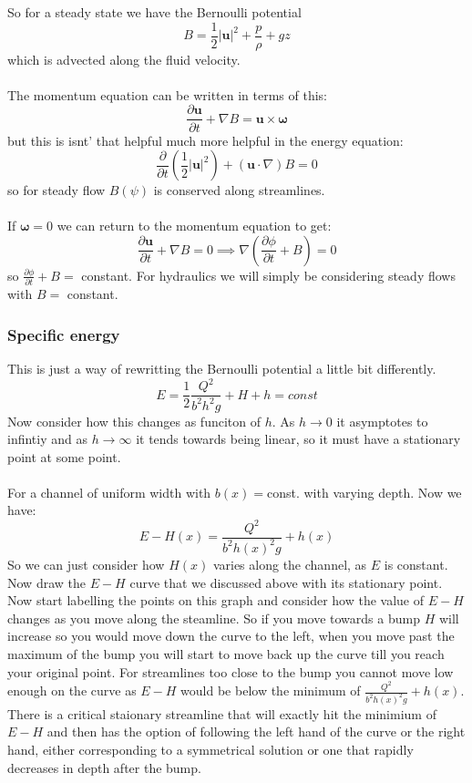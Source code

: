 \documentclass{article}
\begin{document}
So for a steady state we have the Bernoulli potential 
$$
 B = \frac{1}{2} | \bm u|^2 + \frac{p}{\rho} + g z
$$
which is advected along the fluid velocity.\\\\
The momentum equation can be written in terms of this:
$$
 \frac{\partial \bm u}{\partial t} + \nabla B = \bm u \times \bm \omega
$$
but this is isnt' that helpful much more helpful in the energy equation:
$$
 \frac{\partial}{\partial t} ( \frac{1}{2} | \bm u |^2) + (\bm u \cdot \nabla ) B = 0
$$
 so for steady flow $B(\psi)$ is conserved along streamlines.\\\\
 If $\bm \omega = 0$ we can return to the momentum equation to get:
 $$
  \frac{\partial \bm u}{\partial t} + \nabla B  =0 \implies \nabla ( \frac{\partial \phi}{\partial t} + B) = 0
 $$
 so $\frac{\partial \phi}{\partial t} + B =$ constant. For hydraulics we will simply be considering steady flows with $B =$ constant.
 \subsubsection{Specific energy}
 This is just a way of rewritting the Bernoulli potential a little bit differently. 
 $$
  E = \frac{1}{2} \frac{Q^2}{b^2 h^2 g} + H + h = const
 $$
 Now consider how this changes as funciton of $h$. As $h \rightarrow 0$ it asymptotes to infintiy and as $h \rightarrow \infty$ it tends towards being linear, so it must have a stationary point at some point.\\\\
 For a channel of uniform width with $b(x) = $const. with varying depth. Now we have:
 $$
 E- H(x) = \frac{ Q^2}{b^2 h(x)^2 g} +h(x)
 $$
 So we can just consider how $H(x)$ varies along the channel, as $E$ is constant. Now draw the $E-H$ curve that we discussed above with its stationary point. Now start labelling the points on this graph and consider how the value of $E-H$ changes as you move along the steamline. So if you move towards a bump $H$ will increase so you would move down the curve to the left, when you move past the maximum of the bump you will start to move back up the curve till you reach your original point. For streamlines too close to the bump you cannot move low enough on the curve as $E-H$ would be below the minimum of $\frac{ Q^2}{b^2 h(x)^2 g} +h(x)$. There is a critical staionary streamline that will exactly hit the minimium of $E-H$ and then has the option of following the left hand of the curve or the right hand, either corresponding to a symmetrical solution or one that rapidly decreases in depth after the bump.
\end{document}
